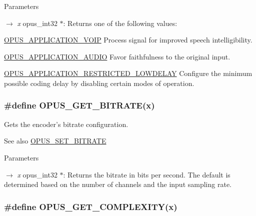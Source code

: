 \begin{DoxyParams}{Parameters}
\item[\mbox{$\rightarrow$} {\em x}]{\ttfamily opus\_\-int32 $\ast$}: Returns one of the following values: 
\begin{DoxyDescription}
\item[\hyperlink{group__opus__ctlvalues_ga07884aa018303a419d1f7acb2f3fa669}{OPUS\_\-APPLICATION\_\-VOIP} ]Process signal for improved speech intelligibility. 
\item[\hyperlink{group__opus__ctlvalues_ga5909f7cb35c04f1110026c6889edd345}{OPUS\_\-APPLICATION\_\-AUDIO} ]Favor faithfulness to the original input. 
\item[\hyperlink{group__opus__ctlvalues_ga592232fb39db60c1369989c5c5d19a07}{OPUS\_\-APPLICATION\_\-RESTRICTED\_\-LOWDELAY} ]Configure the minimum possible coding delay by disabling certain modes of operation. 
\end{DoxyDescription}\end{DoxyParams}
\hypertarget{group__opus__encoderctls_ga1427a5560cbc7e9a59f986d89c05082c}{
\subsubsection[{OPUS\_\-GET\_\-BITRATE}]{\setlength{\rightskip}{0pt plus 5cm}\#define OPUS\_\-GET\_\-BITRATE(x)}}
\label{group__opus__encoderctls_ga1427a5560cbc7e9a59f986d89c05082c}


Gets the encoder's bitrate configuration. \begin{DoxySeeAlso}{See also}
\hyperlink{group__opus__encoderctls_ga0bb51947e355b33d0cb358463b5101a7}{OPUS\_\-SET\_\-BITRATE} 
\end{DoxySeeAlso}

\begin{DoxyParams}{Parameters}
\item[\mbox{$\rightarrow$} {\em x}]{\ttfamily opus\_\-int32 $\ast$}: Returns the bitrate in bits per second. The default is determined based on the number of channels and the input sampling rate. \end{DoxyParams}
\hypertarget{group__opus__encoderctls_ga89755ee721a38d964c7630a920eb27d2}{
\subsubsection[{OPUS\_\-GET\_\-COMPLEXITY}]{\setlength{\rightskip}{0pt plus 5cm}\#define OPUS\_\-GET\_\-COMPLEXITY(x)}}
\label{group__opus__encoderctls_ga89755ee721a38d964c7630a920eb27d2}


